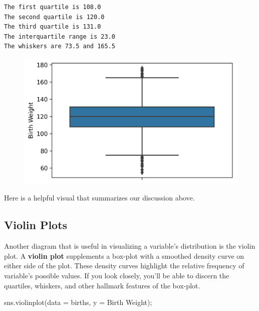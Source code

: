 \documentclass[
  letterpaper,
  DIV=11,
  numbers=noendperiod]{scrreprt}
\newenvironment{Shaded}{\begin{snugshade}}{\end{snugshade}}
\newcommand{\NormalTok}[1]{\textcolor[rgb]{0.00,0.23,0.31}{#1}}
\newcommand{\OperatorTok}[1]{\textcolor[rgb]{0.37,0.37,0.37}{#1}}
\newcommand{\StringTok}[1]{\textcolor[rgb]{0.13,0.47,0.30}{#1}}
\begin{document}
\begin{verbatim}
The first quartile is 108.0
The second quartile is 120.0
The third quartile is 131.0
The interquartile range is 23.0
The whiskers are 73.5 and 165.5
\end{verbatim}

\begin{figure}[H]

{\centering \includegraphics{visualization_1/visualization_1_files/figure-pdf/cell-18-output-2.png}

}

\end{figure}

Here is a helpful visual that summarizes our discussion above.

\hypertarget{violin-plots}{%
\subsection{Violin Plots}\label{violin-plots}}

Another diagram that is useful in visualizing a variable's distribution
is the violin plot. A \textbf{violin plot} supplements a box-plot with a
smoothed density curve on either side of the plot. These density curves
highlight the relative frequency of variable's possible values. If you
look closely, you'll be able to discern the quartiles, whiskers, and
other hallmark features of the box-plot.

\begin{Shaded}
\begin{Highlighting}[]
\NormalTok{sns.violinplot(data }\OperatorTok{=}\NormalTok{ births, y }\OperatorTok{=} \StringTok{\textquotesingle{}Birth Weight\textquotesingle{}}\NormalTok{)}\OperatorTok{;}
\end{Highlighting}
\end{Shaded}
\end{document}
